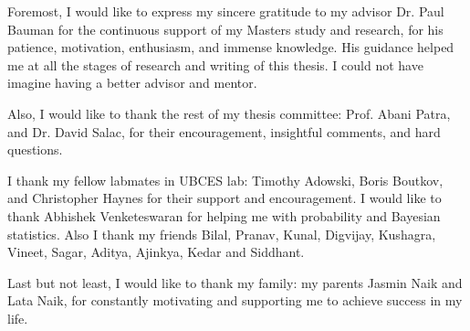  Foremost, I would like to express my sincere gratitude to my advisor Dr. Paul Bauman for the continuous support of my Masters study and research, for his patience, motivation, enthusiasm, and immense knowledge. His guidance helped me at all the stages of research and writing of this thesis. I could not have imagine having a better advisor and mentor.

 Also, I would like to thank the rest of my thesis committee: Prof. Abani Patra,  and Dr. David Salac, for their encouragement, insightful comments, and hard questions.



 I thank my fellow labmates in UBCES lab: Timothy Adowski, Boris Boutkov, and Christopher Haynes for their support and encouragement. I would like to thank Abhishek Venketeswaran for helping me with probability and Bayesian statistics. Also I thank my friends Bilal, Pranav, Kunal, Digvijay, Kushagra, Vineet, Sagar, Aditya, Ajinkya, Kedar and Siddhant.


 Last but not least, I would like to thank my family: my parents Jasmin Naik and Lata Naik, for constantly motivating and supporting me to achieve success in my life. 
